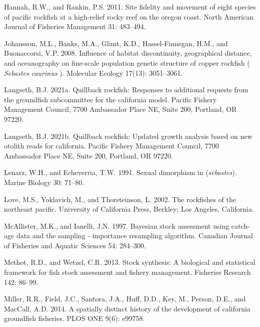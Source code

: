 \documentclass[11pt,
  english,
  letterpaper,
]{article}
\begin{document}
\leavevmode\hypertarget{ref-HannahandRankin_rockfish_site_fidelity_2011}{}%
Hannah, R.W., and Rankin, P.S. 2011. Site fidelity and movement of eight species of pacific rockfish at a high-relief rocky reef on the oregon coast. North American Journal of Fisheries Management 31: 483--494.

\leavevmode\hypertarget{ref-johansson_influence_2008}{}%
Johansson, M.L., Banks, M.A., Glunt, K.D., Hassel-Finnegan, H.M., and Buonaccorsi, V.P. 2008. Influence of habitat discontinuity, geographical distance, and oceanography on fine-scale population genetic structure of copper rockfish ( \emph{Sebastes caurinus} ). Molecular Ecology 17(13): 3051--3061.

\leavevmode\hypertarget{ref-Langseth_augrequests_2021}{}%
Langseth, B.J. 2021a. Quillback rockfish: Responses to additional requests from the groundfish subcommittee for the california model. Pacific Fishery Management Council, 7700 Ambassador Place NE, Suite 200, Portland, OR 97220.

\leavevmode\hypertarget{ref-Langseth_mopupgrowth_2021}{}%
Langseth, B.J. 2021b. Quillback rockfish: Updated growth analysis based on new otolith reads for california. Pacific Fishery Management Council, 7700 Ambassador Place NE, Suite 200, Portland, OR 97220.

\leavevmode\hypertarget{ref-LenarzandEcheverria_dimorphism_1991}{}%
Lenarz, W.H., and Echeverria, T.W. 1991. Sexual dimorphism in (\emph{sebastes}). Marine Biology 30: 71--80.

\leavevmode\hypertarget{ref-loveetal_2002}{}%
Love, M.S., Yoklavich, M., and Thorsteinson, L. 2002. The rockfishes of the northeast pacific. University of California Press, Berkley; Los Angeles, California.

\leavevmode\hypertarget{ref-mcallister_bayesian_1997}{}%
McAllister, M.K., and Ianelli, J.N. 1997. Bayesian stock assessment using catch-age data and the sampling - importance resampling algorithm. Canadian Journal of Fisheries and Aquatic Sciences 54: 284--300.

\leavevmode\hypertarget{ref-methot_stock_2013}{}%
Methot, R.D., and Wetzel, C.R. 2013. Stock synthesis: A biological and statistical framework for fish stock assessment and fishery management. Fisheries Research 142: 86--99.

\leavevmode\hypertarget{ref-Milleretal_2014}{}%
Miller, R.R., Field, J.C., Santora, J.A., Huff, D.D., Key, M., Person, D.E., and MacCall, A.D. 2014. A spatially distinct history of the development of california groundfish fisheries. PLOS ONE 9(6): e99758.
\end{document}
